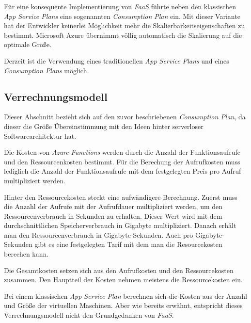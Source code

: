 Für eine konsequente Implementierung von \textit{FaaS} führte neben den klassischen \textit{App Service Plans} eine sogenannten \textit{Consumption Plan} ein. Mit dieser Variante hat der Entwickler keinerlei Möglichkeit mehr die Skalierbarkeitseigenschaften zu bestimmt. Microsoft Azure übernimmt völlig automatisch die Skalierung auf die optimale Größe.

Derzeit ist die Verwendung eines traditionellen \textit{App Service Plans} und eines \textit{Consumption Plans} möglich.

\subsection{Verrechnungsmodell}

Dieser Abschnitt bezieht sich auf den zuvor beschriebenen \textit{Consumption Plan}, da dieser die Größe Übereinstimmung mit den Ideen hinter serverloser Softwarearchitektur hat.

Die Kosten von \textit{Azure Functions} werden durch die Anzahl der Funktionsaufrufe und den Ressourcenkosten bestimmt. Für die Berechung der Aufrufkosten muss lediglich die Anzahl der Funktionsaufrufe mit dem festgelegten Preis pro Aufruf multipliziert werden.

Hinter den Ressourcekosten steckt eine aufwändigere Berechnung. Zuerst muss die Anzahl der Aufrufe mit der Aufrufdauer multipliziert werden, um den Ressourcenverbrauch in Sekunden zu erhalten. Dieser Wert wird mit dem durchschnittlichen Speicherverbrauch in Gigabyte multipliziert. Danach erhält man den Ressourcenverbrauch in Gigabyte-Sekunden. Auch pro Gigabyte-Sekunden gibt es eine festgelegten Tarif mit dem man die Resourcekosten berechen kann.

Die Gesamtkosten setzen sich aus den Aufrufkosten und den Ressourcekosten zusammen. Den Hauptteil der Kosten nehmen meistens die Ressourcekosten ein.

Bei einem klassischen \textit{App Service Plan} berechnen sich die Kosten aus der Anzahl und Größe der virtuellen Maschinen. Aber wie bereits erwähnt, entspricht dieses Verrechnungsmodell nicht den Grundgedanken von \textit{FaaS}.

